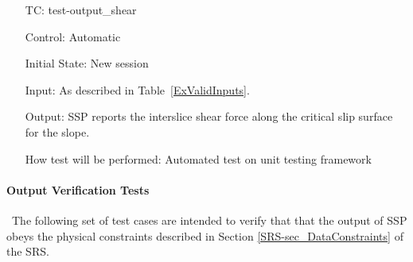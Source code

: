 \documentclass[12pt, titlepage]{article}
\newcounter{testnum} %
\newcommand{\progname}{SSP}
\begin{document}
\begin{enumerate}[label=TC\arabic*:,ref={\arabic*}]
\item [TC\refstepcounter{testnum}\thetestnum: \label{TC_OutShear}] 
test-output\_shear

Control: Automatic

Initial State: New session

Input: As described in Table~\ref{ExValidInputs}.

Output: \progname{} reports the interslice shear force along the critical slip 
surface for the slope.

How test will be performed: Automated test on unit testing framework
	
\end{enumerate}

\paragraph{Output Verification Tests}

~\newline \noindent The following set of test cases are intended to 
verify that that the output of \progname{} obeys the physical constraints 
described in Section \ref{SRS-sec_DataConstraints} of the SRS.
\end{document}
